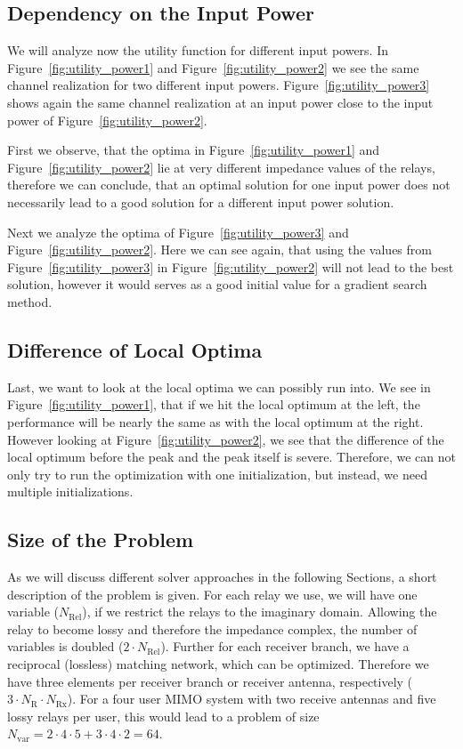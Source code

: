 \subsection{Dependency on the Input Power}
\label{sec:}

We will analyze now the utility function for different input powers.
In Figure~\ref{fig:utility_power1} and Figure~\ref{fig:utility_power2} we see the same channel realization for two different input powers.
Figure~\ref{fig:utility_power3} shows again the same channel realization at an input power close to the input power of Figure~\ref{fig:utility_power2}.

First we observe, that the optima in Figure~\ref{fig:utility_power1} and Figure~\ref{fig:utility_power2} lie at very different impedance values of the relays, therefore we can conclude, that an optimal solution for one input power does not necessarily lead to a good solution for a different input power solution.

Next we analyze the optima of Figure~\ref{fig:utility_power3} and Figure~\ref{fig:utility_power2}.
Here we can see again, that using the values from Figure~\ref{fig:utility_power3} in Figure~\ref{fig:utility_power2} will not lead to the best solution, however it would serves as a good initial value for a gradient search method.


\subsection{Difference of Local Optima}
\label{sec:}

Last, we want to look at the local optima we can possibly run into.
We see in Figure~\ref{fig:utility_power1}, that if we hit the local optimum at the left, the performance will be nearly the same as with the local optimum at the right.
However looking at Figure~\ref{fig:utility_power2}, we see that the difference of the local optimum before the peak and the peak itself is severe.
Therefore, we can not only try to run the optimization with one initialization, but instead, we need multiple initializations.

\subsection{Size of the Problem}
\label{sec:}

As we will discuss different solver approaches in the following Sections, a short description of the problem is given.
For each relay we use, we will have one variable ($N_\text{Rel}$), if we restrict the relays to the imaginary domain.
Allowing the relay to become lossy and therefore the impedance complex, the number of variables is doubled ($2\cdot N_\text{Rel}$).
Further for each receiver branch, we have a reciprocal (lossless) matching network, which can be optimized.
Therefore we have three elements per receiver branch or receiver antenna, respectively ($3\cdot N_\text{R}\cdot N_\text{Rx}$).
For a four user MIMO system with two receive antennas and five lossy relays per user, this would lead to a problem of size $N_\text{var} =  2\cdot 4\cdot 5 + 3\cdot 4\cdot 2 = 64$.

